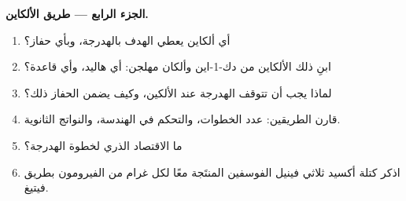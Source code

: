 \begin{problem}
\medskip
\noindent\textbf{الجزء الرابع --- طريق الألكاين.}
\begin{enumerate}[resume]
  \item أي ألكاين يعطي الهدف بالهدرجة، وبأي حفاز؟
  \item ابنِ ذلك الألكاين من دك-1-اين وألكان مهلجن: أي هاليد، وأي قاعدة؟
  \item لماذا يجب أن تتوقف الهدرجة عند الألكين، وكيف يضمن الحفاز ذلك؟
  \item قارن الطريقين: عدد الخطوات، والتحكم في الهندسة، والنواتج الثانوية.
  \item ما الاقتصاد الذري لخطوة الهدرجة؟
  \item اذكر كتلة أكسيد ثلاثي فينيل الفوسفين المنتَجة معًا لكل غرام من الفيرومون بطريق
        فيتيغ.
\end{enumerate}
\end{problem}
